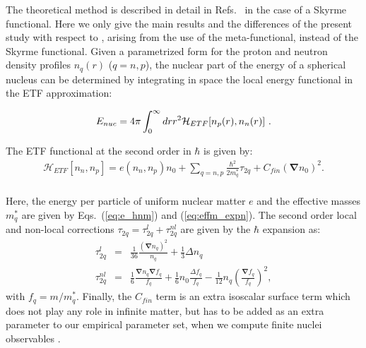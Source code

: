 \documentclass
[aps,prc,twocolumn,showpacs,showkeys,amsmath,floatfix,superscriptaddress]{revtex4}
\begin{document}
The theoretical method is described in detail in Refs.~\cite{Francois1,Francois2} in the case of a Skyrme functional.
Here we only give the main results and the differences of the present study with respect to \cite{Francois1,Francois2}, arising from the use of the meta-functional,
instead of the Skyrme functional.
Given a parametrized form for the proton and neutron density profiles $n_q(r)$ ($q =n,p$), the nuclear part of the energy of a spherical nucleus can be determined by integrating in space the local energy functional in the ETF approximation: 
 
\begin{equation}
 E_{nuc} = 4\pi \int_0^\infty dr r^2 {\cal{H}}_{ETF} [n_p (r), n_n(r)]~.
\label{integral}
\end{equation}

The ETF functional at the second order in $\hbar$ is given by:
\begin{eqnarray}
\mathcal{H}_{ETF}[n_n,n_p] =
 e(n_n,n_p)  n_0
+ \sum_{q=n,p} \frac{\hbar^2}{2m_q^*}  \tau_{2q} 
+  C_{fin} 
 \left( \boldsymbol{\nabla}n_0 \right)^2. \nonumber \\
\label{eq_sym_density_energy_Skyrme}
\end{eqnarray}


Here, the energy per particle of uniform nuclear matter $e$ and the effective masses $m_q^*$ are given by Eqs.~(\ref{eq:e_hnm}) and (\ref{eq:effm_expn}). 
The second order local and non-local corrections $\tau_{2q}=\tau_{2q}^l + \tau_{2q}^{nl}$ are given by the $\hbar$ expansion as:
%
\begin{eqnarray}
\tau_{2q}^l    & =& \frac{1}{36} \frac{ \left( \boldsymbol{\nabla}n_q \right)^2 }{n_q} + \frac{1}{3} \Delta n_q  \label{tau_loc}\\
\tau_{2q}^{nl} & =&
\frac{1}{6} \frac{ \boldsymbol{\nabla}n_q \boldsymbol{\nabla} f_q}{f_q}
+\frac{1}{6}  n_0  \frac{\Delta f_q}{f_q}
- \frac{1}{12}  n_q  \left(  \frac{\boldsymbol{\nabla} f_q}{f_q} \right) ^2, \label{tau_nloc}
\end{eqnarray}
%
with $f_q=m/m_q^*$. 
Finally, the $C_{fin}$ term is an extra isoscalar surface term which does not play any role in infinite matter, but has to be added as an extra parameter to our empirical parameter set, when we compute finite nuclei observables \cite{bulgac15}.
\end{document}
